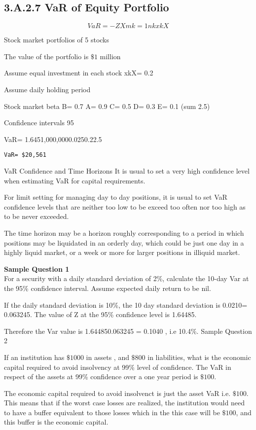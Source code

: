 \documentclass[]{report}
\begin{document}
\subsection{3.A.2.7 VaR of Equity Portfolio}

\[VaR= - ZXmk=1nkxkX\]

Stock market portfolios of 5 stocks

The value of the portfolio is $\$1$ million

Assume equal investment in each stock xkX= 0.2

Assume daily holding period

Stock market beta 
B= 0.7	A= 0.9 C= 0.5 D= 0.3 E= 0.1 (sum 2.5)

Confidence intervals 95%

VaR= 1.6451,000,0000.0250.22.5
\begin{verbatim}
VaR= $20,561
\end{verbatim} 
VaR Confidence and Time Horizons
It is usual to set a very high confidence level when estimating VaR for capital requirements.
 
For limit setting for managing day to day positions, it is usual to set VaR confidence levels that are neither too low to be exceed too often nor too high as to be never exceeded.

The time horizon may be a horizon roughly corresponding to a period in which positions may be liquidated in an orderly day, which could be just one day in a highly liquid market, or a week or more for larger positions in illiquid market.
 
\textbf{Sample Question 1}\\
For a security with a daily standard deviation of 2\%, calculate the 10-day Var at the 95\% confidence interval. Assume expected daily return to be nil.

If the daily standard deviation is 10\%, the 10 day standard deviation is 0.0210= 0.063245. 
The value of Z at the 95\% confidence level is 1.64485.
 
Therefore the Var value is 1.644850.063245 = 0.1040 , i.e 10.4\%.
Sample Question 2
 
If an institution has $\$1000$ in assets , and $\$800$ in liabilities, what is the economic capital required to avoid insolvency at 99\% level of confidence. The VaR in respect of the assets
at 99\% confidence over a one year period is $\$100$.
 
The economic capital required to avoid insolvenct is just the asset VaR i.e. $\$100$. This means that if the worst case losses are realized, the institution would need to have a buffer equivalent to those losses which in the this case will be $\$100$, and this buffer is the economic capital.
 
\end{document}
